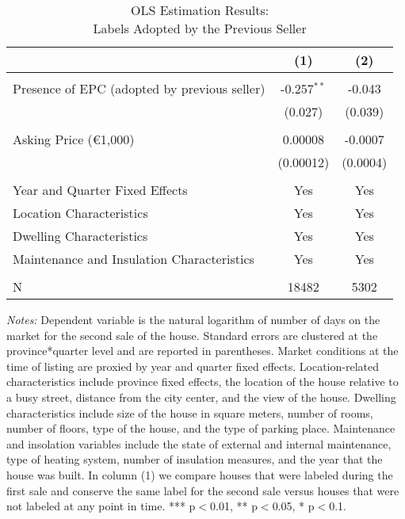 \documentclass[12pt]{article}
\begin{document}
\clearpage
\newpage
\begin{table}[H]
\footnotesize
  \centering
  \caption{OLS Estimation Results:\\ Labels Adopted by the Previous Seller}
      \begin{tabular}{lcc}
\hline
                &\multicolumn{1}{c}{(1)}&\multicolumn{1}{c}{(2)}\\
                
\hline
&&\\
Presence of EPC (adopted by previous seller)& 	-0.257$^{**}$ & -0.043 \\
& (0.027) & (0.039) \\
&&\\
Asking Price (\euro 1,000) & 0.00008 & 	-0.0007  \\
& (0.00012) &  (0.0004) \\
&&\\
Year and Quarter Fixed Effects  & Yes & Yes \\
Location Characteristics & Yes & Yes \\
Dwelling Characteristics  & Yes & Yes \\
Maintenance and Insulation Characteristics & Yes & Yes \\
&&\\
N &	18482 &	5302 \\
\hline

    \end{tabular}%
\begin{tablenotes}
\scriptsize
\item \textit{Notes:} Dependent variable is the natural logarithm of number of days on the market for the second sale of the house. Standard errors are clustered at the province*quarter level and are reported in parentheses. Market conditions at the time of listing are proxied by year and quarter fixed effects. Location-related characteristics include province fixed effects, the location of the house relative to a busy street, distance from the city center, and the view of the house. Dwelling characteristics include size of the house in square meters, number of rooms, number of floors, type of the house, and the type of parking place. Maintenance and insolation variables include the state of external and internal maintenance, type of heating system, number of insulation measures, and the year that the house was built. In column (1) we compare houses that were labeled during the first sale and conserve the same label for the second sale versus houses that were not labeled at any point in time.  *** p$<$0.01, ** p$<$0.05, * p$<$0.1. 
\end{tablenotes}

  \label{tab:addlabel}%
\end{table}%
\end{document}

